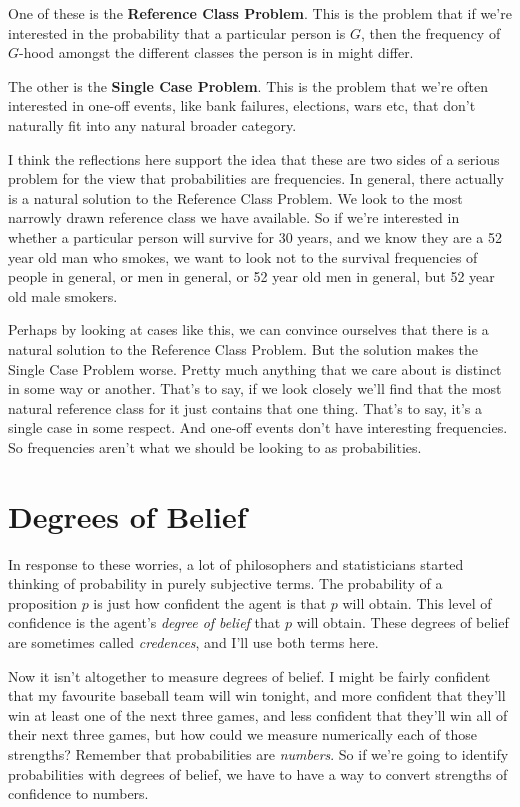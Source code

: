 One of these is the \textbf{Reference Class Problem}. This is the problem that if we're interested in the probability that a particular person is $G$, then the frequency of $G$-hood amongst the different classes the person is in might differ.

The other is the \textbf{Single Case Problem}. This is the problem that we're often interested in one-off events, like bank failures, elections, wars etc, that don't naturally fit into any natural broader category.

I think the reflections here support the idea that these are two sides of a serious problem for the view that probabilities are frequencies. In general, there actually is a natural solution to the Reference Class Problem. We look to the most narrowly drawn reference class we have available. So if we're interested in whether a particular person will survive for 30 years, and we know they are a 52 year old man who smokes, we want to look not to the survival frequencies of people in general, or men in general, or 52 year old men in general, but 52 year old male smokers.

Perhaps by looking at cases like this, we can convince ourselves that there is a natural solution to the Reference Class Problem. But the solution makes the Single Case Problem worse. Pretty much anything that we care about is distinct in some way or another. That's to say, if we look closely we'll find that the most natural reference class for it just contains that one thing. That's to say, it's a single case in some respect. And one-off events don't have interesting frequencies. So frequencies aren't what we should be looking to as probabilities.

\section{Degrees of Belief}
In response to these worries, a lot of philosophers and statisticians started thinking of probability in purely subjective terms. The probability of a proposition $p$ is just how confident the agent is that $p$ will obtain. This level of confidence is the agent's \textit{degree of belief} that $p$ will obtain. These degrees of belief are sometimes called \textit{credences}, and I'll use both terms here.

Now it isn't altogether to measure degrees of belief. I might be fairly confident that my favourite baseball team will win tonight, and more confident that they'll win at least one of the next three games, and less confident that they'll win all of their next three games, but how could we measure numerically each of those strengths? Remember that probabilities are \textit{numbers}. So if we're going to identify probabilities with degrees of belief, we have to have a way to convert strengths of confidence to numbers.

